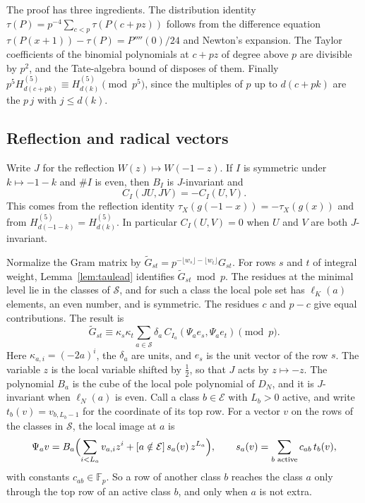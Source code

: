 \documentclass[11pt]{amsart}
\theoremstyle{definition}
\theoremstyle{remark}
\numberwithin{equation}{section}
\newcommand{\F}{\mathbb F}
\begin{document}
The proof has three ingredients. The distribution identity $\tau(P)=p^{-4}\sum_{c<p}\tau(P(c+pz))$ follows from the
difference equation $\tau(P(x+1))-\tau(P)=P''''(0)/24$ and Newton's expansion. The Taylor coefficients of the binomial
polynomials at $c+pz$ of degree above $p$ are divisible by $p^2$, and the Tate-algebra bound of
\cite[Lemma~3.1]{Fauzan2026} disposes of them. Finally $p^5H^{(5)}_{d(c+pk)}\equiv H^{(5)}_{d(k)}\pmod{p^5}$, since the
multiples of $p$ up to $d(c+pk)$ are the $p\,j$ with $j\le d(k)$.

\subsection{Reflection and radical vectors}
Write $J$ for the reflection $W(z)\mapsto W(-1-z)$. If $I$ is symmetric under $k\mapsto-1-k$ and $\#I$ is even, then
$B_I$ is $J$-invariant and
\begin{equation}\label{eq:odd}
 C_I(JU,JV)=-C_I(U,V).
\end{equation}
This comes from the reflection identity $\tau_X(g(-1-x))=-\tau_X(g(x))$ \cite[(3.2)]{Fauzan2026} and from
$H^{(5)}_{d(-1-k)}=H^{(5)}_{d(k)}$. In particular $C_I(U,V)=0$ when $U$ and $V$ are both $J$-invariant.

Normalize the Gram matrix by $\tilde G_{st}=p^{-\lfloor w_s\rfloor-\lfloor w_t\rfloor}G_{st}$. For rows $s$ and $t$ of
integral weight, Lemma~\ref{lem:taulead} identifies $\tilde G_{st}\bmod p$. The residues at the minimal level lie in
the classes of $\mathcal S$, and for such a class the local pole set has $\ell_K(a)$ elements, an even number, and is
symmetric. The residues $c$ and $p-c$ give equal contributions. The result is
\begin{equation}\label{eq:leadform}
 \tilde G_{st}\equiv\kappa_s\kappa_t\sum_{a\in\mathcal S}\delta_a\,C_{I_a}(\Psi_a e_s,\Psi_a e_t)\pmod p .
\end{equation}
Here $\kappa_{a,i}=(-2a)^i$, the $\delta_a$ are units, and $e_s$ is the unit vector of the row $s$. The variable $z$ is
the local variable shifted by $\frac12$, so that $J$ acts by $z\mapsto-z$. The polynomial $B_a$ is the cube of the
local pole polynomial of $D_N$, and it is $J$-invariant when $\ell_N(a)$ is even. Call a class $b\in\mathcal E$ with
$L_b>0$ active, and write $t_b(v)=v_{b,L_b-1}$ for the coordinate of its top row. For a vector $v$ on the rows of the
classes in $\mathcal S$, the local image at $a$ is
\[
 \Psi_av=B_a\Bigl(\sum_{i<L_a}v_{a,i}z^i+[a\notin\mathcal E]\,s_a(v)\,z^{L_a}\Bigr),\qquad
 s_a(v)=\sum_{b\text{ active}}c_{ab}\,t_b(v),
\]
with constants $c_{ab}\in\F_p$. So a row of another class $b$ reaches the class $a$ only through the top row of an
active class $b$, and only when $a$ is not extra.
\end{document}
